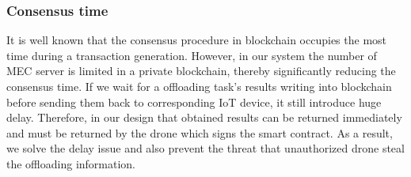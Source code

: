 \subsubsection{Consensus time}
It is well known that the consensus procedure in blockchain occupies the most time during a transaction generation.
However, in our system the number of MEC server is limited in a private blockchain, thereby significantly reducing the consensus time. If we wait for a offloading task's results writing into blockchain before sending them back to corresponding IoT device, it still introduce huge delay. Therefore, in our design that obtained results can be returned immediately and must be returned by the drone which signs the smart contract. As a result, we solve the delay issue and also prevent the threat that unauthorized drone steal the offloading information.     

